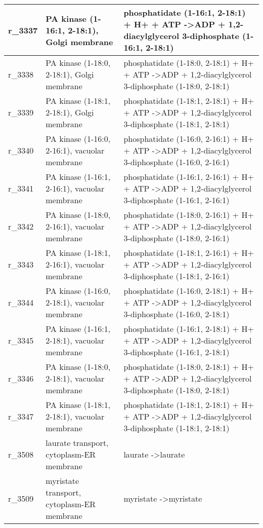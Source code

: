 \begin{landscape}
{\begin{longtable}{|l|p{7cm}|p{15cm}|}
r\_3337 & PA kinase (1-16:1, 2-18:1), Golgi membrane & phosphatidate (1-16:1, 2-18:1) + H+ + ATP  -\textgreater ADP + 1,2-diacylglycerol 3-diphosphate (1-16:1, 2-18:1) \\ \hline
r\_3338 & PA kinase (1-18:0, 2-18:1), Golgi membrane & phosphatidate (1-18:0, 2-18:1) + H+ + ATP  -\textgreater ADP + 1,2-diacylglycerol 3-diphosphate (1-18:0, 2-18:1) \\ \hline
r\_3339 & PA kinase (1-18:1, 2-18:1), Golgi membrane & phosphatidate (1-18:1, 2-18:1) + H+ + ATP  -\textgreater ADP + 1,2-diacylglycerol 3-diphosphate (1-18:1, 2-18:1) \\ \hline
r\_3340 & PA kinase (1-16:0, 2-16:1), vacuolar membrane & phosphatidate (1-16:0, 2-16:1) + H+ + ATP  -\textgreater ADP + 1,2-diacylglycerol 3-diphosphate (1-16:0, 2-16:1) \\ \hline
r\_3341 & PA kinase (1-16:1, 2-16:1), vacuolar membrane & phosphatidate (1-16:1, 2-16:1) + H+ + ATP  -\textgreater ADP + 1,2-diacylglycerol 3-diphosphate (1-16:1, 2-16:1) \\ \hline
r\_3342 & PA kinase (1-18:0, 2-16:1), vacuolar membrane & phosphatidate (1-18:0, 2-16:1) + H+ + ATP  -\textgreater ADP + 1,2-diacylglycerol 3-diphosphate (1-18:0, 2-16:1) \\ \hline
r\_3343 & PA kinase (1-18:1, 2-16:1), vacuolar membrane & phosphatidate (1-18:1, 2-16:1) + H+ + ATP  -\textgreater ADP + 1,2-diacylglycerol 3-diphosphate (1-18:1, 2-16:1) \\ \hline
r\_3344 & PA kinase (1-16:0, 2-18:1), vacuolar membrane & phosphatidate (1-16:0, 2-18:1) + H+ + ATP  -\textgreater ADP + 1,2-diacylglycerol 3-diphosphate (1-16:0, 2-18:1) \\ \hline
r\_3345 & PA kinase (1-16:1, 2-18:1), vacuolar membrane & phosphatidate (1-16:1, 2-18:1) + H+ + ATP  -\textgreater ADP + 1,2-diacylglycerol 3-diphosphate (1-16:1, 2-18:1) \\ \hline
r\_3346 & PA kinase (1-18:0, 2-18:1), vacuolar membrane & phosphatidate (1-18:0, 2-18:1) + H+ + ATP  -\textgreater ADP + 1,2-diacylglycerol 3-diphosphate (1-18:0, 2-18:1) \\ \hline
r\_3347 & PA kinase (1-18:1, 2-18:1), vacuolar membrane & phosphatidate (1-18:1, 2-18:1) + H+ + ATP  -\textgreater ADP + 1,2-diacylglycerol 3-diphosphate (1-18:1, 2-18:1) \\ \hline
r\_3508 & laurate transport, cytoplasm-ER membrane & laurate  -\textgreater laurate \\ \hline
r\_3509 & myristate transport, cytoplasm-ER membrane & myristate  -\textgreater myristate \\ \hline

\end{longtable}}
\end{landscape}
